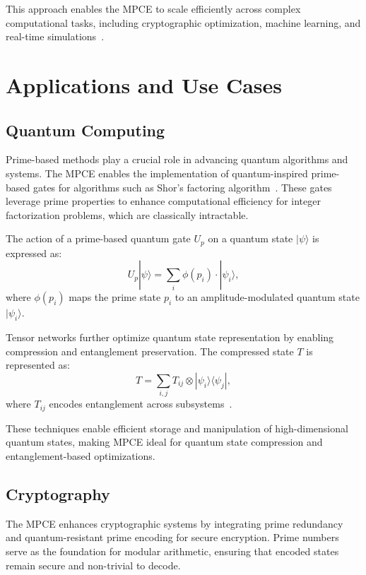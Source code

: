 \documentclass{article}
\theoremstyle{plain}
\begin{document}
This approach enables the MPCE to scale efficiently across complex computational tasks, including cryptographic optimization, machine learning, and real-time simulations~\cite{grover1996fast, wang2021quantum}.

\section{Applications and Use Cases}

\subsection{Quantum Computing}

Prime-based methods play a crucial role in advancing quantum algorithms and systems. The MPCE enables the implementation of quantum-inspired prime-based gates for algorithms such as Shor's factoring algorithm~\cite{shor1994algorithms}. These gates leverage prime properties to enhance computational efficiency for integer factorization problems, which are classically intractable.

The action of a prime-based quantum gate \( U_p \) on a quantum state \( |\psi\rangle \) is expressed as:
\begin{equation}
    U_p |\psi\rangle = \sum_{i} \phi(p_i) \cdot |\psi_i\rangle,
\end{equation}
where \( \phi(p_i) \) maps the prime state \( p_i \) to an amplitude-modulated quantum state \( |\psi_i\rangle \).

Tensor networks further optimize quantum state representation by enabling compression and entanglement preservation. The compressed state \( T \) is represented as:
\begin{equation}
    T = \sum_{i,j} T_{ij} \otimes |\psi_i \rangle \langle \psi_j|,
\end{equation}
where \( T_{ij} \) encodes entanglement across subsystems~\cite{vidal2003efficient, white1992tensor}.

These techniques enable efficient storage and manipulation of high-dimensional quantum states, making MPCE ideal for quantum state compression and entanglement-based optimizations.

\subsection{Cryptography}

The MPCE enhances cryptographic systems by integrating prime redundancy and quantum-resistant prime encoding for secure encryption. Prime numbers serve as the foundation for modular arithmetic, ensuring that encoded states remain secure and non-trivial to decode.
\end{document}
